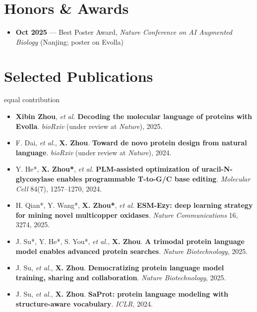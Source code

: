 \documentclass[10pt]{article}
\begin{document}
\section*{Honors \& Awards}
\begin{itemize}
    \item \textbf{Oct 2025} --- Best Poster Award, \textit{Nature Conference on AI Augmented Biology} (Nanjing; poster on Evolla)
\end{itemize}

\section*{Selected Publications}
{\small * equal contribution}
\begin{itemize}
    \item \textbf{Xibin Zhou}, \textit{et al.} \textbf{Decoding the molecular language of proteins with Evolla}. \textit{bioRxiv} (under review at \textit{Nature}), 2025.
    \item F. Dai, \textit{et al.}, \textbf{X. Zhou}. \textbf{Toward de novo protein design from natural language}. \textit{bioRxiv} (under review at \textit{Nature}), 2024.
    \item Y. He*, \textbf{X. Zhou*}, \textit{et al.} \textbf{PLM-assisted optimization of uracil-N-glycosylase enables programmable T-to-G/C base editing}. \textit{Molecular Cell} 84(7), 1257--1270, 2024.
    \item H. Qian*, Y. Wang*, \textbf{X. Zhou*}, \textit{et al.} \textbf{ESM-Ezy: deep learning strategy for mining novel multicopper oxidases}. \textit{Nature Communications} 16, 3274, 2025.
    \item J. Su*, Y. He*, S. You*, \textit{et al.}, \textbf{X. Zhou}. \textbf{A trimodal protein language model enables advanced protein searches}. \textit{Nature Biotechnology}, 2025.
    \item J. Su, \textit{et al.}, \textbf{X. Zhou}. \textbf{Democratizing protein language model training, sharing and collaboration}. \textit{Nature Biotechnology}, 2025.
    \item J. Su, \textit{et al.}, \textbf{X. Zhou}. \textbf{SaProt: protein language modeling with structure-aware vocabulary}. \textit{ICLR}, 2024.
\end{itemize}
\end{document}

